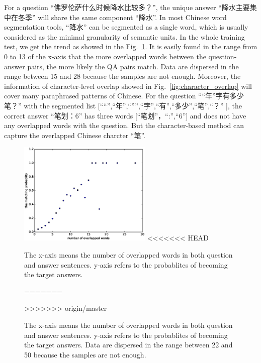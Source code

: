 \documentclass{llncs}
\begin{document}
\begin{table}[!htbp]
\begin{table}[!htbp]
For a question ``佛罗伦萨什么时候降水比较多？'', the unique answer ``降水主要集中在冬季'' will share the same component ``降水''. In most Chinese word segmentation tools, ``降水'' can be
segmented as a single word, which is usually considered as the minimal granularity of semantic units.
In the whole training test, we get the trend as showed in the Fig.~\ref{fig:word_overlap}. It is easily found in the range from 0 to 13 of the x-axis that the more overlapped words between the question-answer pairs, the more likely the QA pairs match. Data are dispersed in the range between 15 and 28 because the samples are not enough. Moreover, the information of character-level overlap showed  in Fig.~\ref{fig:character_overlap} will cover many paraphrased patterns of Chinese. For the question ``“年”字有多少笔？'' with the segmented list [``“'',``年'',``”'',``字'',``有'',``多少'',``笔'',``？'' ], the correct answer ``笔划：6'' has three words [``笔划''，``:'',``6''] and does not have any overlapped words with the question. But the character-based method can capture the overlapped Chinese charcter ``笔''.  
\begin{figure}[htb]
	\begin{minipage}[t]{0.5\linewidth} 
	\subfigure
	\centering
		\includegraphics[width=2.5in]{figures/word_overlap.eps}
<<<<<<< HEAD
		\caption{The x-axis means the number of overlapped words in both question and answer sentences. y-axis refers to the probablites of  becoming the target answers. }
=======
		\caption{The x-axis means the number of overlapped words in both question and answer sentences. y-axis refers to the probablites of  becoming the target answers. Data are dispersed in the range between 22 and 50 because the samples are not enough.}
>>>>>>> origin/master
		\label{fig:word_overlap}
	\end{minipage}
	\hspace{1ex} 

\end{figure}
\end{table}
\end{table}
\end{document}
